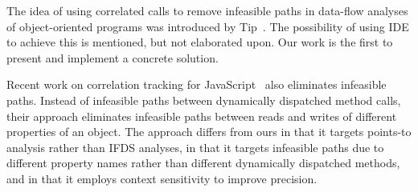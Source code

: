 
The idea of using correlated calls to remove infeasible paths in data-flow analyses of object-oriented programs 
was introduced by Tip~\cite{DBLP:journals/scp/Tip15}. The possibility of using IDE to achieve this is mentioned, 
but not elaborated upon. Our work is the first to present and implement a concrete solution.

Recent work on correlation tracking for JavaScript~\cite{DBLP:conf/ecoop/SridharanDCST12} 
also eliminates infeasible paths. Instead of infeasible paths
between dynamically dispatched method calls, their approach eliminates
infeasible paths between reads and writes of different properties
of an object. 
The approach differs from ours in that it targets points-to analysis rather
than IFDS analyses, in that it targets infeasible paths due to different
property names rather than different dynamically dispatched methods,
and in that it employs context sensitivity to improve precision.


